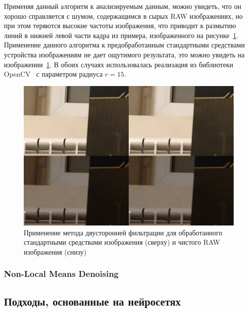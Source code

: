 Применяя данный алгоритм к анализируемым данным, можно увидеть, что он хорошо справляется с шумом, содержащимся в сырых RAW изображениях, но при этом теряются высокие частоты изображения, что приводит к размытию линий в нижней левой части кадра из примера, изображенного на рисунке~\ref{fig:bilinear_comparison}. Применение данного алгоритма к предобработанным стандартными средствами устройства изображениям не дает ощутимого результата, это можно увидеть на изображении~\ref{fig:bilinear_comparison}. В обоих случаях использовалась реализация из библиотеки OpenCV~\autocite{OpenCVLib} с параметром радиуса $r = 15$.

\begin{figure}[h]
	\centering
	\includegraphics[width=\textwidth]{img/bilinear_comparison}
	\caption{Применение метода двусторонней фильтрации для обработанного стандартными средствами изображения (сверху) и чистого RAW изображения (снизу)}
	\label{fig:bilinear_comparison}
\end{figure}

\subsubsection{Non-Local Means Denoising}

\subsection{Подходы, основанные на нейросетях}

\printbibliography[%
    heading=bibintoc%
]



